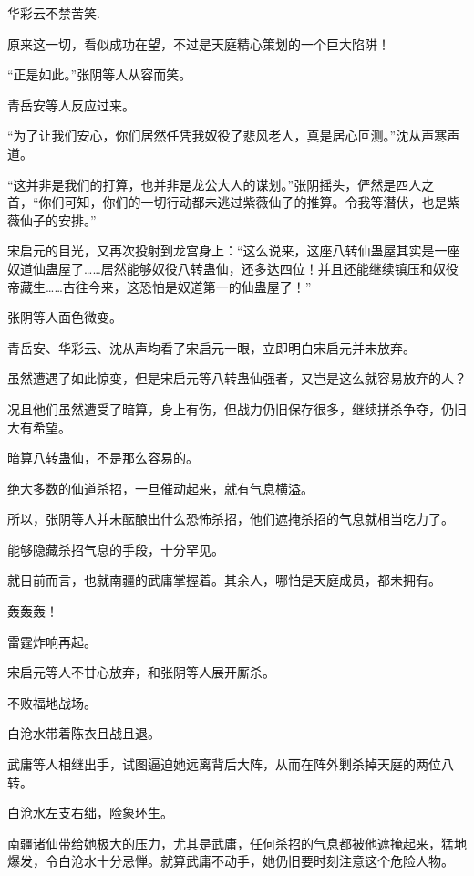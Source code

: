 
\begin{this_body}

华彩云不禁苦笑.

原来这一切，看似成功在望，不过是天庭精心策划的一个巨大陷阱！

“正是如此。”张阴等人从容而笑。

青岳安等人反应过来。

“为了让我们安心，你们居然任凭我奴役了悲风老人，真是居心叵测。”沈从声寒声道。

“这并非是我们的打算，也并非是龙公大人的谋划。”张阴摇头，俨然是四人之首，“你们可知，你们的一切行动都未逃过紫薇仙子的推算。令我等潜伏，也是紫薇仙子的安排。”

宋启元的目光，又再次投射到龙宫身上：“这么说来，这座八转仙蛊屋其实是一座奴道仙蛊屋了……居然能够奴役八转蛊仙，还多达四位！并且还能继续镇压和奴役帝藏生……古往今来，这恐怕是奴道第一的仙蛊屋了！”

张阴等人面色微变。

青岳安、华彩云、沈从声均看了宋启元一眼，立即明白宋启元并未放弃。

虽然遭遇了如此惊变，但是宋启元等八转蛊仙强者，又岂是这么就容易放弃的人？

况且他们虽然遭受了暗算，身上有伤，但战力仍旧保存很多，继续拼杀争夺，仍旧大有希望。

暗算八转蛊仙，不是那么容易的。

绝大多数的仙道杀招，一旦催动起来，就有气息横溢。

所以，张阴等人并未酝酿出什么恐怖杀招，他们遮掩杀招的气息就相当吃力了。

能够隐藏杀招气息的手段，十分罕见。

就目前而言，也就南疆的武庸掌握着。其余人，哪怕是天庭成员，都未拥有。

轰轰轰！

雷霆炸响再起。

宋启元等人不甘心放弃，和张阴等人展开厮杀。

不败福地战场。

白沧水带着陈衣且战且退。

武庸等人相继出手，试图逼迫她远离背后大阵，从而在阵外剿杀掉天庭的两位八转。

白沧水左支右绌，险象环生。

南疆诸仙带给她极大的压力，尤其是武庸，任何杀招的气息都被他遮掩起来，猛地爆发，令白沧水十分忌惮。就算武庸不动手，她仍旧要时刻注意这个危险人物。


\end{this_body}
